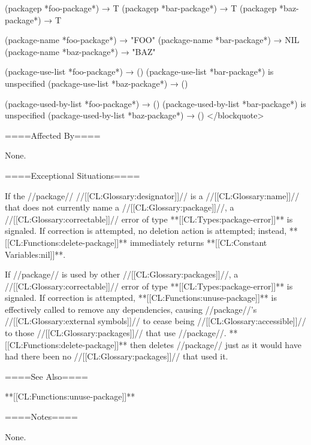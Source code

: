 (packagep *foo-package*) → T (packagep *bar-package*) → T (packagep *baz-package*) → T

(package-name *foo-package*) → "FOO" (package-name *bar-package*) → NIL (package-name *baz-package*) → "BAZ"

(package-use-list *foo-package*) → () (package-use-list *bar-package*) is unspecified (package-use-list *baz-package*) → ()

(package-used-by-list *foo-package*) → () (package-used-by-list *bar-package*) is unspecified (package-used-by-list *baz-package*) → () </blockquote>

====Affected By====

None.

====Exceptional Situations====

If the //package// //[[CL:Glossary:designator]]// is a //[[CL:Glossary:name]]// that does not currently name a //[[CL:Glossary:package]]//, a //[[CL:Glossary:correctable]]// error of type **[[CL:Types:package-error]]** is signaled. If correction is attempted, no deletion action is attempted; instead, **[[CL:Functions:delete-package]]** immediately returns **[[CL:Constant Variables:nil]]**.

If //package// is used by other //[[CL:Glossary:packages]]//, a //[[CL:Glossary:correctable]]// error of type **[[CL:Types:package-error]]** is signaled. If correction is attempted, **[[CL:Functions:unuse-package]]** is effectively called to remove any dependencies, causing //package//'s //[[CL:Glossary:external symbols]]// to cease being //[[CL:Glossary:accessible]]// to those //[[CL:Glossary:packages]]// that use //package//. **[[CL:Functions:delete-package]]** then deletes //package// just as it would have had there been no //[[CL:Glossary:packages]]// that used it.

====See Also====

**[[CL:Functions:unuse-package]]**

====Notes====

None.




 
